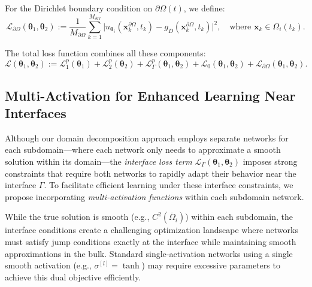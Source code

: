 \documentclass{article}
\begin{document}
For the Dirichlet boundary condition on $\partial\Omega(t)$, we define:
\begin{equation}
\mathcal{L}_{\partial \Omega}(\boldsymbol{\theta}_1, \boldsymbol{\theta}_2) := \frac{1}{M_{\partial \Omega}} \sum_{k=1}^{M_{\partial \Omega}}
\bigl|u_{\boldsymbol{\theta}_i}(\boldsymbol{x}_k^{\partial\Omega}, t_k) - g_D(\boldsymbol{x}_k^{\partial\Omega}, t_k)\bigr|^2, \quad \text{where } \boldsymbol{x}_k \in \Omega_i(t_k).
\end{equation}

The total loss function combines all these components:
\begin{equation}
\mathcal{L}(\boldsymbol{\theta}_1, \boldsymbol{\theta}_2) := \mathcal{L}_1^p(\boldsymbol{\theta}_1) + \mathcal{L}_2^p(\boldsymbol{\theta}_2) + \mathcal{L}_{\Gamma}^p(\boldsymbol{\theta}_1, \boldsymbol{\theta}_2) + \mathcal{L}_0(\boldsymbol{\theta}_1, \boldsymbol{\theta}_2) + \mathcal{L}_{\partial \Omega}(\boldsymbol{\theta}_1, \boldsymbol{\theta}_2).
\end{equation}

\subsection{Multi-Activation for Enhanced Learning Near Interfaces}\label{Multi-Activation}

Although our domain decomposition approach employs separate networks for each subdomain---where each network only needs to approximate a smooth solution within its domain---the \emph{interface loss term} $\mathcal{L}_{\Gamma}(\boldsymbol{\theta}_1, \boldsymbol{\theta}_2)$ imposes strong constraints that require both networks to rapidly adapt their behavior near the interface $\Gamma$. To facilitate efficient learning under these interface constraints, we propose incorporating \emph{multi-activation functions} within each subdomain network.

While the true solution is smooth (e.g., $C^2(\overline{\Omega}_i)$) within each subdomain, the interface conditions create a challenging optimization landscape where networks must satisfy jump conditions exactly at the interface while maintaining smooth approximations in the bulk. Standard single-activation networks using a single smooth activation (e.g., $\sigma^{[l]} = \tanh$) may require excessive parameters to achieve this dual objective efficiently.
\end{document}
